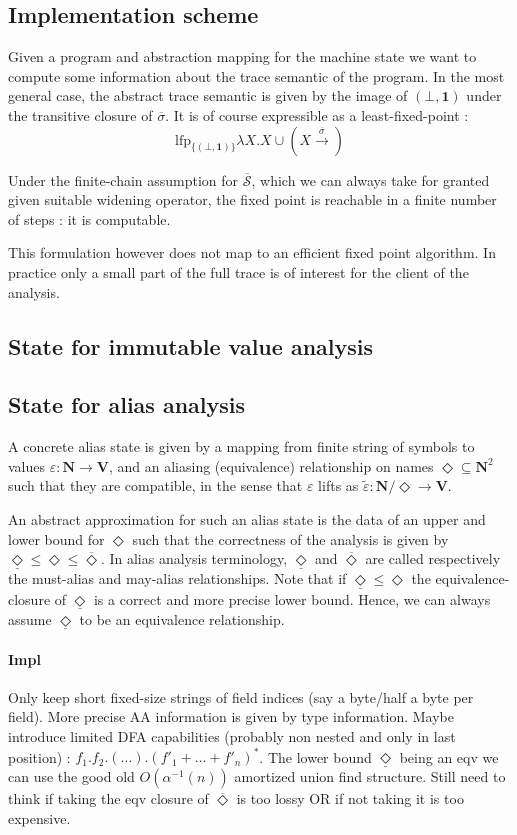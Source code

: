 \documentclass[14pt]{article}
\newcommand{\eps}{\varepsilon}
\newcommand{\D}{\Diamond}
\newcommand{\uD}{\underline{\Diamond}}
\newcommand{\UD}{\overline{\Diamond}}
\begin{document}
\subsection{Implementation scheme}

Given a program and abstraction mapping for the machine state we want to compute some information about the trace semantic of the program. In the most general case, the abstract trace semantic is given by the image of $(\bot,\mathbf{1})$ under the transitive closure of $\overline{\sigma}$. It is of course expressible as a least-fixed-point :
\[ \text{lfp}_{\{(\bot,\mathbf{1})\}}\lambda X. X\cup\left(X\xrightarrow{\overline{\sigma}}\right)\]

Under the finite-chain assumption for $\overline{\mathcal{S}}$, which we can always take for granted given suitable widening operator, the fixed point is reachable in a finite number of steps : it is computable.

This formulation however does not map to an efficient fixed point algorithm. In practice only a small part of the full trace is of interest for the client of the analysis.

\subsection{State for immutable value analysis}

\subsection{State for alias analysis}

A concrete alias state is given by a mapping from finite string of symbols to values $\eps:\mathbf{N}\to\mathbf{V}$, and an aliasing (equivalence) relationship on names $\D \subseteq \mathbf{N}^2$ such that they are compatible, in the sense that $\eps$ lifts as $\tilde{\eps} : \mathbf{N}/\D \to \mathbf{V}$.

An abstract approximation for such an alias state is the data of an upper and lower bound for $\D$ such that the correctness of the analysis is given by $\uD\leq\D\leq\UD$. In alias analysis terminology, $\uD$ and $\UD$ are called respectively the must-alias and may-alias relationships. Note that if $\uD\leq\D$ the equivalence-closure of $\uD$ is a correct and more precise lower bound. Hence, we can always assume $\uD$ to be an equivalence relationship.

\paragraph{Impl} Only keep short fixed-size strings of field indices (say a byte/half a byte per field). More precise AA information is given by type information. Maybe introduce limited DFA capabilities (probably non nested and only in last position) : $f_1.f_2.(\dots).(f'_1+\dots+f'_n)^*$. The lower bound $\uD$ being an eqv we can use the good old $O(\alpha^{-1}(n))$ amortized union find structure. Still need to think if taking the eqv closure of $\UD$ is too lossy OR if not taking it is too expensive.
\end{document}
